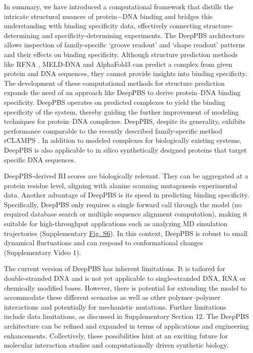 \par
In summary, we have introduced a computational framework that distills the intricate structural nuances of protein$-$DNA binding and bridges this understanding with binding specificity data, effectively connecting structure-determining and specificity-determining experiments. The DeepPBS architecture allows inspection of family-specific ‘groove readout’ and ‘shape readout’ patterns and their effects on binding specificity. Although structure prediction methods like RFNA \citep{baek2024na}, MELD-DNA \citep{Esmaeeli2023} and AlphaFold3 \citep{Abramson2024} can predict a complex from given protein and DNA sequences, they cannot provide insights into binding specificity. The development of these computational methods for structure prediction expands the need of an approach like DeepPBS to derive protein–DNA binding specificity. DeepPBS operates on predicted complexes to yield the binding specificity of the system, thereby guiding the further improvement of modeling techniques for protein–DNA complexes. DeepPBS, despite its generality, exhibits performance comparable to the recently described family-specific method rCLAMPS \citep{Wetzel2022}. In addition to modeled complexes for biologically existing systems, DeepPBS is also applicable to in silico synthetically designed proteins that target specific DNA sequences.
\par
DeepPBS-derived RI scores are biologically relevant. They can be aggregated at a protein residue level, aligning with alanine scanning mutagenesis experimental data. Another advantage of DeepPBS is its speed in predicting binding specificity. Specifically, DeepPBS only requires a single forward call through the model (no required database search or multiple sequence alignment computation), making it suitable for high-throughput applications such as analyzing MD simulation trajectories (Supplementary \hyperref[fig:pdnaS6]{Fig. S6}). In this context, DeepPBS is robust to small dynamical fluctuations and can respond to conformational changes (Supplementary Video 1).
\par
The current version of DeepPBS has inherent limitations. It is tailored for double-stranded DNA and is not yet applicable to single-stranded DNA, RNA or chemically modified bases. However, there is potential for extending the model to accommodate these different scenarios as well as other polymer–polymer interactions and potentially for mechanistic mutations. Further limitations include data limitations, as discussed in Supplementary Section 12. The DeepPBS architecture can be refined and expanded in terms of applications and engineering enhancements. Collectively, these possibilities hint at an exciting future for molecular interaction studies and computationally driven synthetic biology. 

